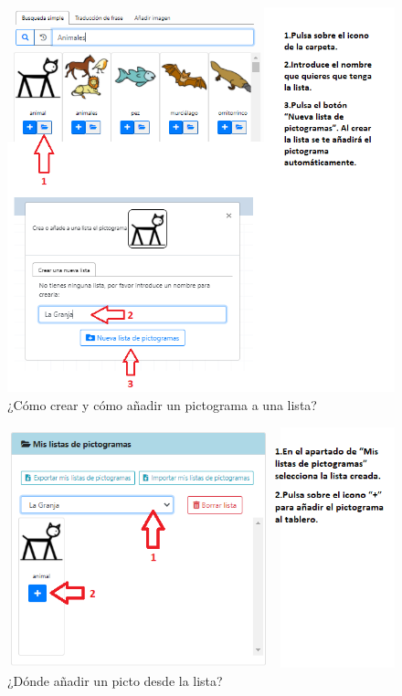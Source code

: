 \begin{figure}[h!]
	\centering
	\includegraphics[width=\linewidth]{Imagenes/Bitmap/Tarea2-Pista2}
	\caption{¿Cómo crear y cómo añadir un pictograma a una lista?}
	\label{fig:tarea2-pista2}
\end{figure}

\begin{figure}[h!]
	\centering
	\includegraphics[width=\linewidth]{Imagenes/Bitmap/Tarea2-Pista3}
	\caption{¿Dónde añadir un picto desde la lista?}
	\label{fig:tarea2-pista3}
\end{figure}


